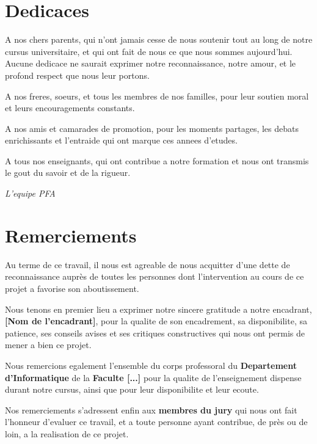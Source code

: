 \documentclass[12pt,a4paper,oneside]{report}
\begin{document}
\chapter*{Dedicaces}

\noindent A nos chers parents, qui n'ont jamais cesse de nous soutenir tout au
long de notre cursus universitaire, et qui ont fait de nous ce que nous sommes
aujourd'hui. Aucune dedicace ne saurait exprimer notre reconnaissance, notre
amour, et le profond respect que nous leur portons.

\bigskip
\noindent A nos freres, soeurs, et tous les membres de nos familles, pour leur
soutien moral et leurs encouragements constants.

\bigskip
\noindent A nos amis et camarades de promotion, pour les moments partages, les
debats enrichissants et l'entraide qui ont marque ces annees d'etudes.

\bigskip
\noindent A tous nos enseignants, qui ont contribue a notre formation et nous
ont transmis le gout du savoir et de la rigueur.

\bigskip
\hfill {\itshape L'equipe PFA}

\chapter*{Remerciements}

Au terme de ce travail, il nous est agreable de nous acquitter d'une dette de
reconnaissance auprès de toutes les personnes dont l'intervention au cours de
ce projet a favorise son aboutissement.

Nous tenons en premier lieu a exprimer notre sincere gratitude a notre
encadrant, \textbf{[Nom de l'encadrant]}, pour la qualite de son encadrement,
sa disponibilite, sa patience, ses conseils avises et ses critiques
constructives qui nous ont permis de mener a bien ce projet.

Nous remercions egalement l'ensemble du corps professoral du
\textbf{Departement d'Informatique} de la \textbf{Faculte [...]} pour la qualite
de l'enseignement dispense durant notre cursus, ainsi que pour leur
disponibilite et leur ecoute.

Nos remerciements s'adressent enfin aux \textbf{membres du jury} qui nous ont
fait l'honneur d'evaluer ce travail, et a toute personne ayant contribue, de
près ou de loin, a la realisation de ce projet.
\end{document}
